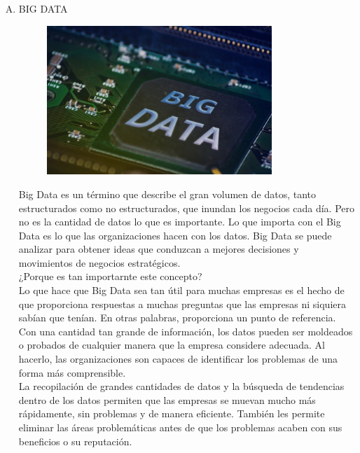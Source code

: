 \documentclass[preprint,12pt]{elsarticle}
\begin{document}
		\begin{enumerate}[A)]
			\item BIG DATA 
			
			\begin{figure}[htb]
				\begin{center}
					\includegraphics[width=8.5cm]{./Imagenes/img1}
				\end{center}
			\end{figure}
		
			Big Data es un término que describe el gran volumen de datos, tanto estructurados como no estructurados, que inundan los negocios cada día. Pero no es la cantidad de datos lo que es importante. Lo que importa con el Big Data es lo que las organizaciones hacen con los datos. Big Data se puede analizar para obtener ideas que conduzcan a mejores decisiones y movimientos de negocios estratégicos.\cite{bib03:BA:Online} \\ 
			
			¿Porque es tan importarnte este concepto?\\
			
			Lo que hace que Big Data sea tan útil para muchas empresas es el hecho de que proporciona respuestas a muchas preguntas que las empresas ni siquiera sabían que tenían. En otras palabras, proporciona un punto de referencia. Con una cantidad tan grande de información, los datos pueden ser moldeados o probados de cualquier manera que la empresa considere adecuada. Al hacerlo, las organizaciones son capaces de identificar los problemas de una forma más comprensible.\\
			
			La recopilación de grandes cantidades de datos y la búsqueda de tendencias dentro de los datos permiten que las empresas se muevan mucho más rápidamente, sin problemas y de manera eficiente. También les permite eliminar las áreas problemáticas antes de que los problemas acaben con sus beneficios o su reputación.\\
			

\end{enumerate}
\end{document}
